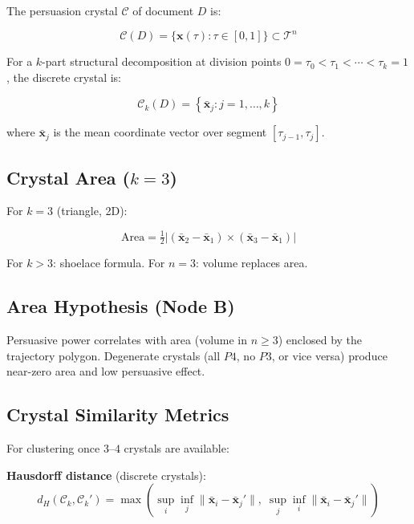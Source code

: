 \documentclass{article}
\begin{document}
The persuasion crystal $\mathcal{C}$ of document $D$ is:

\begin{equation}
\mathcal{C}(D) = \{\mathbf{x}(\tau) : \tau \in [0,1]\}
  \subset \mathcal{T}^n
\end{equation}

For a $k$-part structural decomposition at division points
$0 = \tau_0 < \tau_1 < \cdots < \tau_k = 1$, the discrete crystal is:

\begin{equation}
\mathcal{C}_k(D) = \left\{\bar{\mathbf{x}}_j : j = 1,\ldots,k\right\}
\end{equation}

where $\bar{\mathbf{x}}_j$ is the mean coordinate vector over
segment $[\tau_{j-1}, \tau_j]$.

\subsection*{Crystal Area ($k = 3$)}

For $k = 3$ (triangle, 2D):

\begin{equation}
\text{Area} = \tfrac{1}{2}
  \left|(\bar{\mathbf{x}}_2 - \bar{\mathbf{x}}_1)
  \times (\bar{\mathbf{x}}_3 - \bar{\mathbf{x}}_1)\right|
\end{equation}

For $k > 3$: shoelace formula. For $n = 3$: volume replaces area.

\subsection*{Area Hypothesis (Node B)}

Persuasive power correlates with area (volume in $n \geq 3$) enclosed
by the trajectory polygon. Degenerate crystals (all $P4$, no $P3$,
or vice versa) produce near-zero area and low persuasive effect.

\subsection*{Crystal Similarity Metrics}

For clustering once $3$--$4$ crystals are available:

\textbf{Hausdorff distance} (discrete crystals):
\begin{equation}
d_H(\mathcal{C}_k, \mathcal{C}_k') = \max\left(
  \sup_i \inf_j \|\bar{\mathbf{x}}_i - \bar{\mathbf{x}}_j'\|,\;
  \sup_j \inf_i \|\bar{\mathbf{x}}_i - \bar{\mathbf{x}}_j'\|
\right)
\end{equation}
\end{document}
